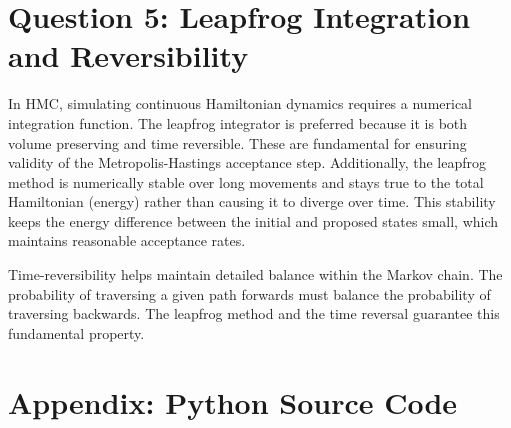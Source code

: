 \documentclass[conference]{IEEEtran}
\begin{document}
\section{Question 5: Leapfrog Integration and Reversibility}

In HMC, simulating continuous Hamiltonian dynamics requires a numerical integration function. The leapfrog integrator is preferred because it is both volume preserving and time reversible. These are fundamental for ensuring validity of the Metropolis-Hastings acceptance step. Additionally, the leapfrog method is numerically stable over long movements and stays true to the total Hamiltonian (energy) rather than causing it to diverge over time. This stability keeps the energy difference between the initial and proposed states small, which maintains reasonable acceptance rates.

Time-reversibility helps maintain detailed balance within the Markov chain. The probability of traversing a given path forwards must balance the probability of traversing backwards. The leapfrog method and the time reversal guarantee this fundamental property.

\section*{Appendix: Python Source Code}

\end{document}
